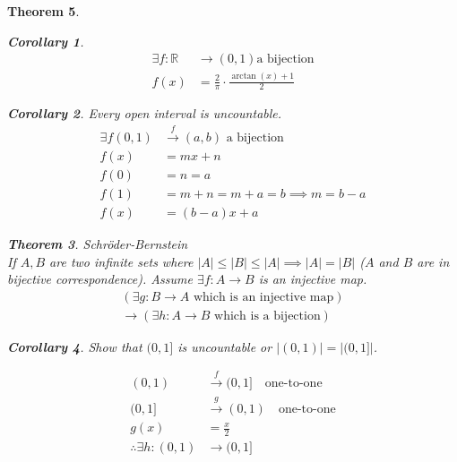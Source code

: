\documentclass[letterpaper, 12pt]{article}
\newtheorem{theorem}{Theorem}[section]
\newtheorem{corollary}[theorem]{Corollary}
\newenvironment{proof}[1][Proof]{\begin{trivlist}
\item[\hskip \labelsep {\bfseries #1}]}{\end{trivlist}}
\newcommand{\then}{\rightarrow}
\newcommand{\reals}{\mathbb{R}}
\begin{document}
\begin{theorem}
\begin{enumerate}
\begin{corollary}
\begin{align*}
                \exists f : \reals &\rightarrow (0, 1) \text{a bijection} \\
                f(x) &= \frac{2}{\pi} \cdot \frac{\arctan(x) + 1}{2}
            \end{align*}
        \end{corollary}
        \begin{corollary}
            Every open interval is uncountable.
            \begin{align*}
                \exists f (0, 1) &\xrightarrow{f} (a, b) \text{ a bijection} \\
                f(x) &= mx + n \\
                f(0) &= n = a \\
                f(1) &= m + n = m + a = b \implies m = b - a \\
                f(x) &= (b - a)x + a
            \end{align*}
        \end{corollary}
        \begin{theorem}
            Schröder-Bernstein \\
            If $A, B$ are two infinite sets where $|A| \le |B| \le |A| \implies |A| = |B|$ 
            ($A$ and $B$ are in bijective correspondence).
            Assume $\exists f : A \to B$ is an injective map.
            \begin{multline*}
                (\exists g : B \to A \text{ which is an injective map}) \\
                \then (\exists h: A \to B \text{ which is a bijection})
            \end{multline*}
        \end{theorem}
        \begin{corollary}
            Show that $(0, 1]$ is uncountable or $|(0, 1)| = |(0, 1]|$.
            \begin{proof}
                \begin{align*}
                    (0, 1) &\xrightarrow{f} (0, 1] \quad \text{one-to-one}\\
                    (0, 1] &\xrightarrow{g} (0, 1) \quad \text{one-to-one} \\
                    g(x) &= \frac{x}{2} \\
                    \therefore \exists h: (0, 1) &\to (0, 1]
                \end{align*}
            \end{proof}
        \end{corollary}
        \end{enumerate}
    \end{theorem}
\end{document}
